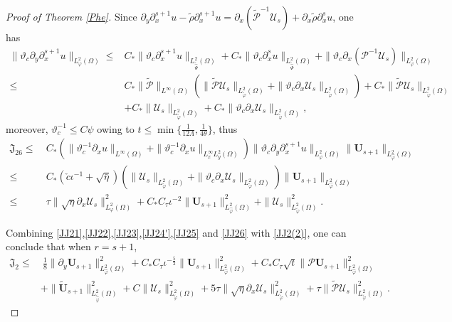 \documentclass{amsart}
\numberwithin{equation}{section}
\begin{document}
\begin{proof}[Proof of Theorem \ref{Phe}]
Since $\partial_{y}\partial_{x}^{s+1}u-\tilde{\rho}\partial_{x}^{s+1}u=\partial_{x}(\tilde{\mathcal{P}}^{-1}\mathcal{U}_{s})+\partial_{x}\tilde{\rho}\partial_{x}^{s}u$, one has
\begin{align*}
\|\vartheta_{c}\partial_{y}\partial_{x}^{s+1}u\|_{L_{\varphi}^{2}(\Omega)}
\leq& C_{*}\|\vartheta_{c}\partial_{x}^{s+1}u\|_{L_{\tilde{\hat{\Psi}}}^{2}(\Omega)}
    +C_{*}\|\vartheta_{c}\partial_{x}^{s}u\|_{L_{\tilde{\hat{\Psi}}}^{2}(\Omega)}
    +\|\vartheta_{c}\partial_{x}(\mathcal{P}^{-1}\mathcal{U}_{s})\|_{L_{\varphi}^{2}(\Omega)}\\
\leq& C_{*}\|\tilde{\mathcal{P}}\|_{L^{\infty}(\Omega)}
           \left(\|\tilde{\mathcal{P}}\mathcal{U}_{s}\|_{L_{\tilde{\varphi}}^{2}(\Omega)}+\|\vartheta_{c}\partial_{x}\mathcal{U}_{s}\|_{L_{\tilde{\varphi}}^{2}(\Omega)}\right)
     +C_{*}\|\tilde{\mathcal{P}}\mathcal{U}_{s}\|_{L_{\tilde{\varphi}}^{2}(\Omega)}\\
    &+C_{*}\|\mathcal{U}_{s}\|_{L_{\tilde{\varphi}}^{2}(\Omega)}
     +C_{*}\|\vartheta_{c}\partial_{x}\mathcal{U}_{s}\|_{L_{\tilde{\varphi}}^{2}(\Omega)},
\end{align*}
moreover, $\vartheta_{c}^{-1}\leq C\psi$ owing to $t\leq \min\{\frac{1}{12\Lambda},\frac{1}{4\theta}\}$, thus
\begin{align}\label{JJ26}
\mathfrak{J}_{26}
\leq&~C_{*}\left(\|\vartheta_{c}^{-1}\partial_{x}u\|_{L^{\infty}(\Omega)}
                 +\|\vartheta_{c}^{-1}\partial_{x}u\|_{L_{x}^{\infty}L_{y}^{2}(\Omega)}\right)
          \|\vartheta_{c}\partial_{y}\partial_{x}^{s+1}u\|_{L_{\varphi}^{2}(\Omega)}\|\mathbf{U}_{s+1}\|_{L_{\hat{\varphi}}^{2}(\Omega)}\\
\leq&~C_{*}(\check{c}\iota^{-1}+\sqrt{\bar{\eta}})
           \left(\|\mathcal{U}_{s}\|_{L_{\tilde{\varphi}}^{2}(\Omega)}+\|\vartheta_{c}\partial_{x}\mathcal{U}_{s}\|_{L_{\tilde{\varphi}}^{2}(\Omega)}\right)
           \|\mathbf{U}_{s+1}\|_{L_{\hat{\varphi}}^{2}(\Omega)}\nonumber\\
\leq&~\tau\|\sqrt{\eta}\partial_{x}\mathcal{U}_{s}\|_{L_{\varphi}^{2}(\Omega)}^{2}
     +C_{*}C_{\tau}\iota^{-2}\|\mathbf{U}_{s+1}\|_{L_{\hat{\varphi}}^{2}(\Omega)}^{2}
     +\|\mathcal{U}_{s}\|_{L_{\tilde{\varphi}}^{2}(\Omega)}^{2}.\nonumber
\end{align}

Combining \eqref{JJ21},\eqref{JJ22},\eqref{JJ23},\eqref{JJ24'},\eqref{JJ25} and \eqref{JJ26} with \eqref{JJ2(2)}, one can conclude that when $r=s+1$,
\begin{align*}
\mathfrak{J}_{2}
\leq&~\frac{1}{8}\|\partial_{y}\mathbf{U}_{s+1}\|_{L_{\hat{\varphi}}^{2}(\Omega)}^{2}
     +C_{*}C_{\tau}\iota^{-\frac{5}{2}}\|\mathbf{U}_{s+1}\|_{L_{\hat{\varphi}}^{2}(\Omega)}^{2}
     +C_{*}C_{\tau}\sqrt{t}\|\mathcal{P}\mathbf{U}_{s+1}\|_{L_{\hat{\varphi}}^{2}(\Omega)}^{2}\\
    &+\|\tilde{\mathbf{U}}_{s+1}\|_{L_{\tilde{\hat{\varphi}}}^{2}(\Omega)}^{2}
     +C\|\mathcal{U}_{s}\|_{L_{\tilde{\varphi}}^{2}(\Omega)}^{2}
     +5\tau\|\sqrt{\eta}\partial_{x}\mathcal{U}_{s}\|_{L_{\tilde{\varphi}}^{2}(\Omega)}^{2}
     +\tau\|\tilde{\mathcal{P}}\mathcal{U}_{s}\|_{L_{\tilde{\varphi}}^{2}(\Omega)}^{2}.
\end{align*}


\end{proof}
\end{document}
